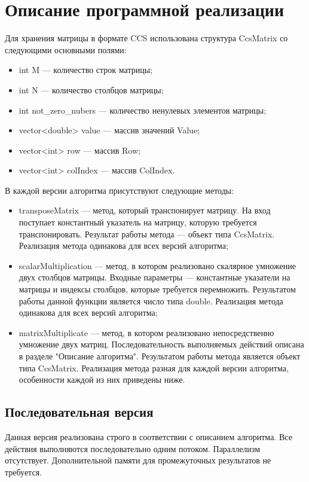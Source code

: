 \documentclass{report}
\begin{document}
\section*{Описание программной реализации}
\par Для хранения матрицы в формате CCS использована структура CcsMatrix со следующими основными полями:
\begin{itemize}
	\item int M — количество строк матрицы;
	\item int N — количество столбцов матрицы;
	\item int not\_zero\_nubers — количество ненулевых элементов матрицы;
	\item vector<double> value — массив значений Value;
	\item vector<int> row — массив Row;
	\item vector<int> colIndex — массив ColIndex.
\end{itemize}
\par В каждой версии алгоритма присутствуют следующие методы:
\begin{itemize}
	\item transposeMatrix — метод, который транспонирует матрицу. На вход поступает константный указатель на матрицу, которую требуется транспонировать. Результат работы метода — объект типа CcsMatrix. Реализация метода одинакова для всех версий алгоритма;
	\item scalarMultiplication — метод, в котором реализовано скалярное умножение двух столбцов матрицы. Входные параметры — константные указатели на матрицы и индексы столбцов, которые требуется перемножить. Результатом работы данной функции является число типа double. Реализация метода одинакова для всех версий алгоритма;
	\item matrixMultiplicate — метод, в котором реализовано непосредственно умножение двух матриц. Последовательность выполняемых действий описана в разделе "Описание алгоритма". Результатом работы метода является объект типа CcsMatrix. Реализация метода разная для каждой версии алгоритма, особенности каждой из них приведены ниже.
\end{itemize}

\subsection*{Последовательная версия}
\par Данная версия реализована строго в соответствии с описанием алгоритма. Все действия выполняются последовательно одним потоком. Параллелизм отсутствует. Дополнительной памяти для промежуточных результатов не требуется.
\end{document}
